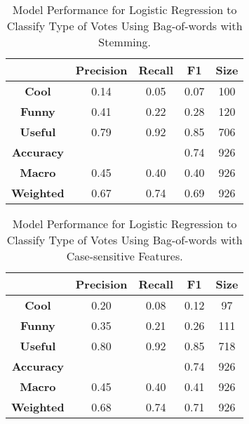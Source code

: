 \documentclass[11pt,a4paper]{article}
\begin{document}
\begin{table}[h!]
\centering
 \begin{tabular}{|c c c c c|} 
 \hline
 & {\bf Precision} & {\bf Recall} & {\bf F1} & {\bf Size} \\ [0.5ex] 
 \hline\hline
 {\bf Cool } & 0.14 & 0.05 & 0.07 & 100\\ 
 {\bf Funny } & 0.41 & 0.22 & 0.28 & 120 \\
 {\bf Useful } & 0.79 & 0.92 & 0.85 & 706 \\

 {\bf Accuracy } & & & 0.74 & 926 \\
 {\bf Macro } & 0.45 & 0.40 & 0.40 & 926 \\
 {\bf Weighted } & 0.67 & 0.74 & 0.69 & 926\\ [1ex] 
 \hline
 \end{tabular}
    \caption{\label{tab:Table 11}Model Performance for Logistic Regression to Classify Type of Votes Using Bag-of-words with Stemming.}

\end{table}

\begin{table}[h!]
\centering
 \begin{tabular}{|c c c c c|} 
 \hline
 & {\bf Precision} & {\bf Recall} & {\bf F1} & {\bf Size} \\ [0.5ex] 
 \hline\hline
 {\bf Cool } & 0.20 & 0.08 & 0.12 & 97\\ 
 {\bf Funny } & 0.35 & 0.21 & 0.26 & 111 \\
 {\bf Useful } & 0.80 & 0.92 & 0.85 & 718 \\

 {\bf Accuracy } & & & 0.74 & 926 \\
 {\bf Macro } & 0.45 & 0.40 & 0.41 & 926 \\
 {\bf Weighted } & 0.68 & 0.74 & 0.71 & 926\\ [1ex] 
 \hline
 \end{tabular}
     \caption{\label{tab:Table 12}Model Performance for Logistic Regression to Classify Type of Votes Using Bag-of-words with Case-sensitive Features.}

\end{table}

\clearpage


\end{document}
